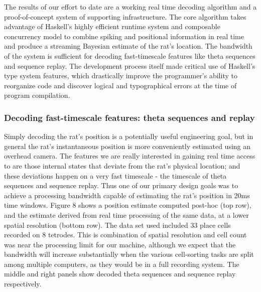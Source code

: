 \documentclass[]{article}
\begin{document}
The results of our effort to date are a working real time decoding
algorithm and a proof-of-concept system of supporting infrastructure.
The core algorithm takes advantage of Haskell's highly efficient runtime
system and composable concurrency model to combine spiking and
positional information in real time and produce a streaming Bayesian
estimate of the rat's location. The bandwidth of the system is
sufficient for decoding fast-timescale features like theta sequences and
sequence replay. The development process itself made critical use of
Haskell's type system features, which drastically improve the
programmer's ability to reorganize code and discover logical and
typographical errors at the time of program compilation.

\subsubsection{Decoding fast-timescale features: theta sequences and
replay}

Simply decoding the rat's position is a potentially useful engineering
goal, but in general the rat's instantaneous position is more
conveniently estimated using an overhead camera. The features we are
really interested in gaining real time access to are those internal
states that deviate from the rat's physical location; and these
deviations happen on a very fast timescale - the timescale of theta
sequences and sequence replay. Thus one of our primary design goals was
to achieve a processing bandwidth capable of estimating the rat's
position in 20ms time windows. Figure 8 shows a position estimate
computed post-hoc (top row), and the estimate derived from real time
processing of the same data, at a lower spatial resolution (bottom row).
The data set used included 33 place cells recorded on 8 tetrodes. This
is combination of spatial resolution and cell count was near the
processing limit for our machine, although we expect that the bandwidth
will increase substantially when the various cell-sorting tasks are
split among multiple computers, as they would be in a full recording
system. The middle and right panels show decoded theta sequences and
sequence replay respectively.
\end{document}
